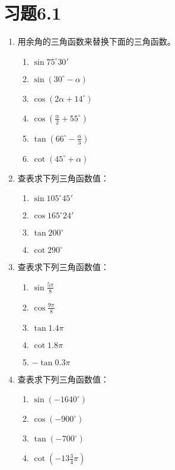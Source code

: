 \section*{习题6.1}
\begin{enumerate}
    \item 用余角的三角函数来替换下面的三角函数。
\begin{multicols}{2}
\begin{enumerate}
    \item $\sin75^{\circ}30'$
    \item $\sin(30^{\circ}-\alpha)$
    \item $\cos(2\alpha+14^{\circ})$
    \item $\cos\left(\frac{\alpha}{2}+55^{\circ}\right)$
    \item $\tan\left(66^{\circ}-\frac{\alpha}{3}\right)$
    \item $\cot(45^{\circ}+\alpha)$
\end{enumerate}
\end{multicols}
    \item 查表求下列三角函数值：
\begin{multicols}{2}
    \begin{enumerate}
        \item $\sin105^{\circ}45'$
        \item $\cos165^{\circ}24'$
        \item $\tan200^{\circ}$
        \item $\cot290^{\circ}$
    \end{enumerate}
    \end{multicols}
    \item 查表求下列三角函数值：
\begin{multicols}{2}
\begin{enumerate}
    \item $\sin\frac{5\pi}{8}$
    \item $\cos\frac{9\pi}{8}$
    \item $\tan 1.4\pi$
    \item $\cot 1.8\pi$
    \item $-\tan 0.3\pi$
\end{enumerate}
\end{multicols}

\item 查表求下列三角函数值：
\begin{multicols}{2}
\begin{enumerate}
    \item $\sin(-1640^{\circ})$
    \item $\cos(-900^{\circ})$
    \item $\tan(-700^{\circ})$
    \item $\cot\left(-13\frac{3}{4}\pi\right)$
\end{enumerate}
\end{multicols}


\end{enumerate}
